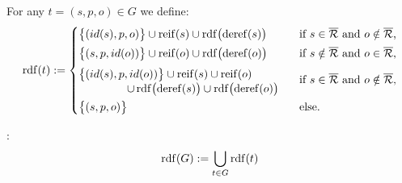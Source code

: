 \noindent
For any {\RDFplusTriple} $t = (s,p,o) \in G$ we define:
\begin{equation*}
	\fctDescent{t} := \begin{cases}
\vspace{1mm}
		\big\lbrace (id(s),p,o) \big\rbrace \cup \mathrm{reif}(s) \cup \symDescentFct\bigl(\fctDeref{s}\bigr) & \text{if $s \in \symAllTRefs$ and $o \notin \symAllTRefs$,} \\
\vspace{1mm}
		\big\lbrace (s,p,id(o)) \big\rbrace \cup \mathrm{reif}(o) \cup \symDescentFct\bigl(\fctDeref{o}\bigr) & \text{if $s \notin \symAllTRefs$ and $o \in \symAllTRefs$,} \\
\vspace{1mm}
		\begin{minipage}[c]{65mm}\vspace{1mm}
			$\big\lbrace (id(s),p,id(o)) \big\rbrace \cup \mathrm{reif}(s) \cup \mathrm{reif}(o)$ \\
			\hspace*{15mm}$\cup \, \symDescentFct\bigl(\fctDeref{s}\bigr) \cup \symDescentFct\bigl(\fctDeref{o}\bigr)$
		\end{minipage} & \text{if $s \in \symAllTRefs$ and $o \notin \symAllTRefs$,} \\
		\big\lbrace (s,p,o) \big\rbrace & \text{else} .
\end{cases}
\end{equation*}

\noindent
{}:
\begin{equation*}
	\mathrm{rdf}(G) := \bigcup_{t \in G} \mathrm{rdf}(t)
\end{equation*}


